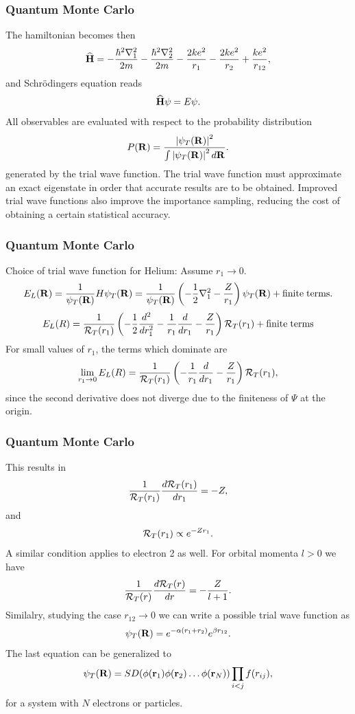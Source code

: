 \documentclass[compress]{beamer}
\newcommand{\OP}[1]{{\bf\widehat{#1}}}
\begin{document}
\frame
{
  \frametitle{Quantum Monte Carlo}
\begin{small}
{\scriptsize
The hamiltonian becomes then
\[
   \OP{H}=-\frac{\hbar^2\nabla_1^2}{2m}-\frac{\hbar^2\nabla_2^2}{2m}
          -\frac{2ke^2}{r_1}-\frac{2ke^2}{r_2}+
               \frac{ke^2}{r_{12}},
\]
and  Schr\"odingers equation reads
\[
   \OP{H}\psi=E\psi.
\]
All observables are evaluated with respect to the probability distribution
\[
   P({\bf R})= \frac{\left|\psi_T({\bf R})\right|^2}{\int \left|\psi_T({\bf R})\right|^2d{\bf R}}.
\]
generated by the trial wave function.   
The trial wave function must approximate an exact 
eigenstate in order that accurate results are to be obtained. 
Improved trial
wave functions also improve the importance sampling, 
reducing the cost of obtaining a certain statistical accuracy. 
}
\end{small}
}


\frame
{
  \frametitle{Quantum Monte Carlo}
\begin{small}
{\scriptsize
Choice of trial wave function for Helium:
Assume $r_1 \rightarrow 0$.
\[
   E_L({\bf R})=\frac{1}{\psi_T({\bf R})}H\psi_T({\bf R})=
     \frac{1}{\psi_T({\bf R})}\left(-\frac{1}{2}\nabla^2_1
     -\frac{Z}{r_1}\right)\psi_T({\bf R}) + \mathrm{finite \hspace{0.1cm}terms}.
\]
\[ 
    E_L(R)=
    \frac{1}{{\cal R}_T(r_1)}\left(-\frac{1}{2}\frac{d^2}{dr_1^2}-
     \frac{1}{r_1}\frac{d}{dr_1}
     -\frac{Z}{r_1}\right){\cal R}_T(r_1) + \mathrm{finite\hspace{0.1cm} terms}
\]
For small values of $r_1$, the terms which dominate are
\[ 
    \lim_{r_1 \rightarrow 0}E_L(R)=
    \frac{1}{{\cal R}_T(r_1)}\left(-
     \frac{1}{r_1}\frac{d}{dr_1}
     -\frac{Z}{r_1}\right){\cal R}_T(r_1),
\]
since the second derivative does not diverge due to the finiteness of 
$\Psi$ at the origin.
}
\end{small}
}


\frame
{
\frametitle{Quantum Monte Carlo}
\begin{small}
{\scriptsize
This results in
\[
     \frac{1}{{\cal R}_T(r_1)}\frac{d {\cal R}_T(r_1)}{dr_1}=-Z,
\]
and
\[
   {\cal R}_T(r_1)\propto e^{-Zr_1}.
\]
A similar condition applies to electron 2 as well. 
For orbital momenta $l > 0$ we have 
\[
     \frac{1}{{\cal R}_T(r)}\frac{d {\cal R}_T(r)}{dr}=-\frac{Z}{l+1}.
\]
Similalry, studying the case $r_{12}\rightarrow 0$ we can write 
a possible trial wave function as
\[
   \psi_T({\bf R})=e^{-\alpha(r_1+r_2)}e^{\beta r_{12}}.
    \label{eq:wavehelium2}
\]
The last equation can be generalized to
\[
   \psi_T({\bf R})=SD(\phi({\bf r}_1)\phi({\bf r}_2)\dots\phi({\bf r}_N))
                   \prod_{i< j}f(r_{ij}),
\]
for a system with $N$ electrons or particles. 
}
\end{small}
}
\end{document}
